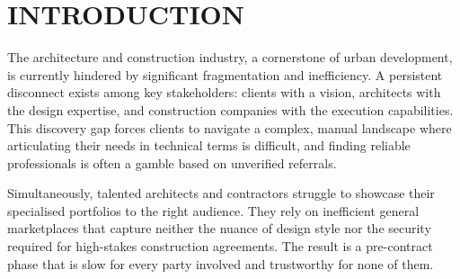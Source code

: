 %
%
%
\chapter{INTRODUCTION}
\label{ch:introduction}


The architecture and construction industry, a cornerstone of urban
development, is currently hindered by significant fragmentation and
inefficiency. A persistent disconnect exists among key stakeholders:
clients with a vision, architects with the design expertise, and
construction companies with the execution capabilities. This discovery
gap forces clients to navigate a complex, manual landscape where
articulating their needs in technical terms is difficult, and finding
reliable professionals is often a gamble based on unverified referrals.

Simultaneously, talented architects and contractors struggle to showcase
their specialised portfolios to the right audience. They rely on
inefficient general marketplaces that capture neither the nuance of
design style nor the security required for high-stakes construction
agreements. The result is a pre-contract phase that is slow for every
party involved and trustworthy for none of them.

